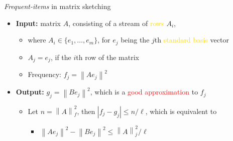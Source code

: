 \documentclass[first=dgreen,second=purple,logo=redque]{aaltoslides}
\newcommand{\vectornorm}[1]{\left\|#1\right\|}
\begin{document}
\begin{frame}[allowframebreaks=1]{\textit{Frequent-items} in matrix sketching}

\begin{itemize}
  \item \textbf{Input:} matrix $A$, consisting of a stream of
  \textcolor{gold}{rows} $A_{i}$,
  	\begin{itemize}\item where $A_{i} \in \{ e_{1}, \ldots, e_{m} \}$, for
  	$e_{j}$ being the $j$th \textcolor{gold}{standard basis} vector
  	
  	\item $A_{j} = e_{j}$, if the $i$th row of the matrix
  	\item Frequency: $f_{j} = \vectornorm{Ae_{j}}^{2}$\\
  \end{itemize}
  \item \textbf{Output:} $g_{j} = \vectornorm{Be_{j}}^{2}$, which is a
  	\textcolor{red}{good approximation} to $f_{j}$
  \begin{itemize}\item Let $n = \vectornorm{A}_{f}^{2}$, then $|f_{j} -
  g_{j}| \leq n / \ell$, which is equivalent to
  \begin{itemize}\item $\vectornorm{Ae_{j}}^{2} -
  \vectornorm{Be_{j}}^{2} \leq \vectornorm{A}_{j}^{2} / \ell$\end{itemize}
  \end{itemize}
\end{itemize}

\end{frame}

\end{document}
